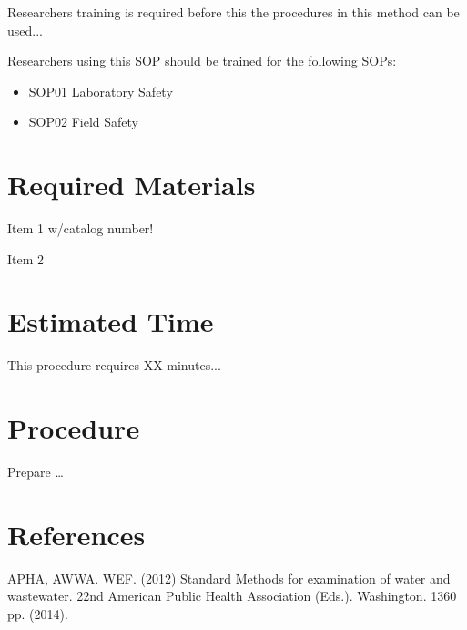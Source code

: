 \documentclass[12pt]{../SOP3_alpha}
\begin{document}
\NP Researchers training is required before this the procedures in this method can be used... 

\NP Researchers using this SOP should be trained for the following SOPs:

\begin{itemize}
  \item SOP01 Laboratory Safety
  \item SOP02 Field Safety
\end{itemize}

\section{Required Materials}

\NP Item 1 w/catalog number!

\NP Item 2

\section{Estimated Time}

\NP This procedure requires XX minutes...

\section{Procedure}

\NP Prepare \dots

\NP

\section{References}

\NP APHA, AWWA. WEF. (2012) Standard Methods for examination of water and wastewater. 22nd American Public Health Association (Eds.). Washington. 1360 pp. (2014).
\end{document}
